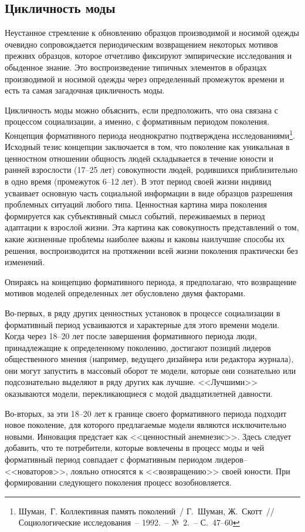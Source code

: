   \subsection{Цикличность моды}
  Неустанное стремление к обновлению образцов производимой и носимой одежды
  очевидно сопровождается периодическим возвращением некоторых мотивов прежних
  образцов, которое отчетливо фиксируют эмпирические исследования и обыденное
  знание. Это воспроизведение типичных элементов в образцах производимой и
  носимой одежды через определенный промежуток времени и есть та самая
  загадочная цикличность моды.
  
  Цикличность моды можно объяснить, если предположить, что она связана с
  процессом социализации, а именно, с формативным периодом поколения. Концепция
  формативного периода неоднократно подтверждена
  исследованиями\footnote{Шуман,~Г. Коллективная память поколений~/ Г.~Шуман,
  Ж.~Скотт~// Социологические исследования~-- 1992.~-- №~2.~-- С.~47--60}.
  Исходный тезис концепции заключается в том, что поколение как уникальная в
  ценностном отношении общность людей складывается в течение юности и ранней
  взрослости (17--25 лет) совокупности людей, родившихся приблизительно в одно
  время (промежуток 6--12 лет). В этот период своей жизни индивид усваивает
  основную часть социальной информации в виде образцов разрешения проблемных
  ситуаций любого типа. Ценностная картина мира поколения формируется как
  субъективный смысл событий, переживаемых в период адаптации к взрослой жизни.
  Эта картина как совокупность представлений о том, какие жизненные проблемы
  наиболее важны и каковы наилучшие способы их решения, воспроизводится на
  протяжении всей жизни поколения практически без изменений.
  
  Опираясь на концепцию формативного периода, я предполагаю, что возвращение
  мотивов моделей определенных лет обусловлено двумя факторами.
  
  Во-первых, в ряду других ценностных установок в процессе социализации в
  формативный период усваиваются и характерные для этого времени модели. Когда
  через 18--20 лет после завершения формативного периода люди, принадлежащие к
  определенному поколению, достигают позиций лидеров общественного мнения
  (например, ведущего дизайнера или редактора журнала), они могут запустить в
  массовый оборот те модели, которые они сознательно или подсознательно
  выделяют в ряду других как лучшие. <<Лучшими>> оказываются модели,
  перекликающиеся с модой двадцатилетней давности.
  
  Во-вторых, за эти 18--20 лет к границе своего формативного периода подходит
  новое поколение, для которого предлагаемые модели являются исключительно
  новыми. Инновация предстает как <<ценностный анемнезис>>. Здесь следует
  добавить, что те потребители, которые вовлечены в процесс моды и чей
  формативный период совпадает с формативным периодом лидеров--<<новаторов>>,
  лояльно относятся к <<возвращению>> своей юности. При формировании следующего
  поколения процесс возобновляется.
  
